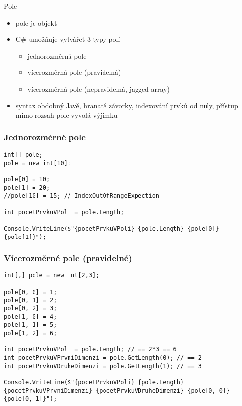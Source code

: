 \begin{frame}[fragile]
\begin{block}{Pole}
\begin{itemize}
\item pole je objekt
\item C\# umožňuje vytvářet 3 typy polí
\begin{itemize}
\item jednorozměrná pole
\item vícerozměrná pole (pravidelná)
\item vícerozměrná pole (nepravidelná, jagged array)
\end{itemize}

\item syntax obdobný Javě, hranaté závorky, indexování prvků od nuly, přístup mimo rozsah pole vyvolá výjimku
\end{itemize}
\end{block}
\end{frame}

\begin{frame}[fragile]
\frametitle{Jednorozměrné pole}
\begin{yesblock}
\begin{lstlisting}
int[] pole;
pole = new int[10];

pole[0] = 10;
pole[1] = 20;
//pole[10] = 15; // IndexOutOfRangeExpection

int pocetPrvkuVPoli = pole.Length;

Console.WriteLine($"{pocetPrvkuVPoli} {pole.Length} {pole[0]} {pole[1]}");
\end{lstlisting}
\end{yesblock}
\end{frame}



\begin{frame}[fragile]
\frametitle{Vícerozměrné pole (pravidelné)}
\begin{yesblock}
\begin{lstlisting}
int[,] pole = new int[2,3];

pole[0, 0] = 1;
pole[0, 1] = 2;
pole[0, 2] = 3;
pole[1, 0] = 4;
pole[1, 1] = 5;
pole[1, 2] = 6;

int pocetPrvkuVPoli = pole.Length; // == 2*3 == 6
int pocetPrvkuVPrvniDimenzi = pole.GetLength(0); // == 2
int pocetPrvkuVDruheDimenzi = pole.GetLength(1); // == 3

Console.WriteLine($"{pocetPrvkuVPoli} {pole.Length} {pocetPrvkuVPrvniDimenzi} {pocetPrvkuVDruheDimenzi} {pole[0, 0]} {pole[0, 1]}");
\end{lstlisting}
\end{yesblock}
\end{frame}


